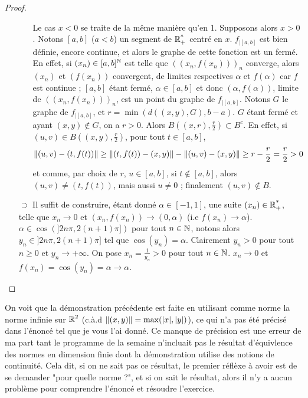 \documentclass[10pt]{scrartcl}
\begin{document}
\begin{proof}
\begin{itemize}
\begin{enumerate}[1.]
                    Le cas $x<0$ se traite de la même manière qu'en 1. Supposons alors $x>0$. Notons $[a,b]$ ($a<b$) un segment de $\operatorname{\mathbb R_+^*}$ centré en $x$.
                    $f_{|[a,b]}$ est bien définie, encore continue, et alors le graphe de cette fonction est un fermé.
                    En effet, si $(x_n)\in[a,b]^{\operatorname{\mathbb N}}$ est telle que $((x_n,f(x_n)))_n$ converge, alors $(x_n)$ et $(f(x_n))$ convergent, de limites respectives $\alpha$ et $f(\alpha)$ car 
                    $f$ est continue ; $[a,b]$ étant fermé, $\alpha\in[a,b]$ et donc $(\alpha,f(\alpha))$, limite de $((x_n,f(x_n)))_n$, est un point du graphe de $f_{|[a,b]}$.
                    Notons $G$ le graphe de $f_{|[a,b]}$, et $r=\min(d((x,y),G),b-a)$. $G$ étant fermé et ayant $(x,y)\notin G$, on a $r>0$.
                    Alors $B\left((x,r),\frac r2\right)\subset B^c$. En effet, si $(u,v)\in B\left((x,y),\frac r2\right)$, pour tout $t\in[a,b]$, 
                    \[
                        \lVert (u,v)-(t,f(t))\rVert\geq \lVert (t,f(t))-(x,y)\rVert-\lVert (u,v)-(x,y)\rVert\geq r-\frac r2=\frac r2>0
                    \]
                    et comme, par choix de $r$, $u\in[a,b]$, si $t\notin[a,b]$, alors $(u,v)\neq(t,f(t))$, mais aussi $u\neq 0$ ; finalement $(u,v)\notin B$.
                \end{enumerate}
                \item[$\boxed\supset$] Il suffit de construire, étant donné $\alpha\in[-1,1]$, une suite $(x_n)\in\operatorname{\mathbb R_+^*}$, telle que $x_n\to 0$ et $(x_n,f(x_n))\to (0,\alpha)$ (i.e $f(x_n)\to \alpha$).
                $\alpha\in\cos(]2n\pi,2(n+1)\pi])$ pour tout $n\in\operatorname{\mathbb N}$, notons alors $y_n\in]2n\pi,2(n+1)\pi]$ tel que $\cos(y_n)=\alpha$. 
                Clairement $y_n>0$ pour tout $n\geq 0$ et $y_n\to +\infty$. On pose $x_n=\frac1{y_n}>0$ pour tout $n\in\operatorname{\mathbb N}$. 
                $x_n\to 0$ et $f(x_n)=\cos(y_n)=\alpha\to\alpha$.
        \end{itemize}
    \end{proof}

    \begin{remarks}
        On voit que la démonstration précédente est faite en utilisant comme norme la norme infinie sur $\operatorname{\mathbb R}^2$ (c.à.d $\lVert (x,y)\rVert=\max(|x|,|y|)$), ce qui n'a pas été précisé dans l'énoncé tel que je vous l'ai donné. 
        Ce manque de précision est une erreur de ma part tant le programme de la semaine n'incluait pas le résultat d'équivlence des normes en dimension finie dont la démonstration utilise des notions de continuité. 
        Cela dit, si on ne sait pas ce résultat, le premier réflèxe à avoir est de se demander "pour quelle norme ?", et si on sait le résultat, alors il n'y a aucun problème pour comprendre l'énoncé et résoudre l'exercice.
    \end{remarks}
\end{document}
